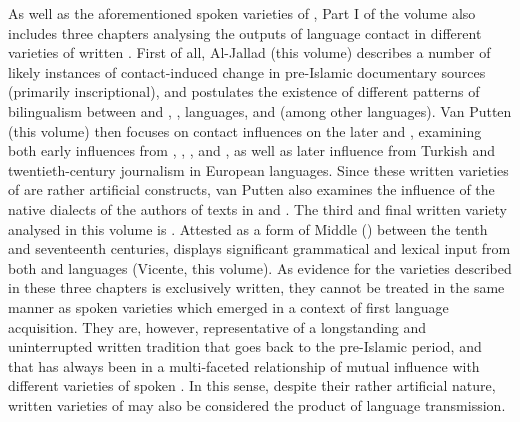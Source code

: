 \documentclass[output=paper]{langsci/langscibook}
\begin{document}
As well as the aforementioned spoken varieties of , Part I of the volume also includes three chapters analysing the outputs of language contact in different varieties of written . First of all, Al-Jallad (this volume) describes a number of likely instances of contact-induced change in pre-Islamic  documentary sources (primarily inscriptional), and postulates the existence of different patterns of {bilingualism} between  and , ,  languages, and  (among other languages). Van Putten (this volume) then focuses on contact influences on the later  and , examining both early influences from , , ,  and , as well as later influence from  {Turkish} and twentieth-century journalism in European languages. Since these written varieties of  are rather artificial constructs, van Putten also examines the influence of the native  dialects of the authors of texts in   and . The third and final written  variety analysed in this volume is  . Attested as a form of Middle  (\citealt{Lentin2011Middle}) between the tenth and seventeenth centuries,   displays significant grammatical and lexical input from both  and  languages (Vicente, this volume). As evidence for the  varieties described in these three chapters is exclusively written, they cannot be treated in the same manner as spoken varieties which emerged in a context of first language acquisition. They are, however, representative of a longstanding and uninterrupted written tradition that goes back to the pre-Islamic period, and that has always been in a multi-faceted relationship of mutual influence with different varieties of spoken . In this sense, despite their rather artificial nature, written varieties of  may also be considered the product of language {transmission}.
\end{document}
